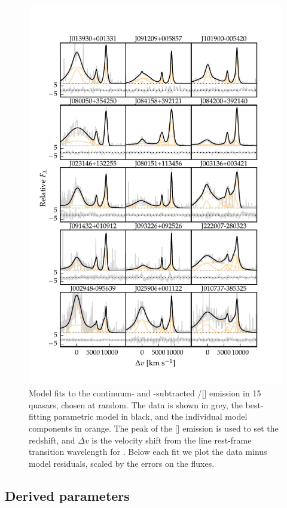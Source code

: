 \begin{figure}
    \centering
    \includegraphics[width=\textwidth]{figures/chapter04/example_spectrum_grid.pdf} 
    \caption{Model fits to the continuum- and -subtracted \hbns/[] emission in 15 quasars, chosen at random. The data is shown in grey, the best-fitting parametric model in black, and the individual model components in orange. The peak of the [] emission is used to set the redshift, and $\Delta{v}$ is the velocity shift from the line rest-frame transition wavelength for \hb. Below each fit we plot the data minus model residuals, scaled by the errors on the fluxes.}     
    \label{fig:example_spectrum_grid}
\end{figure}

\subsection{Derived parameters}

